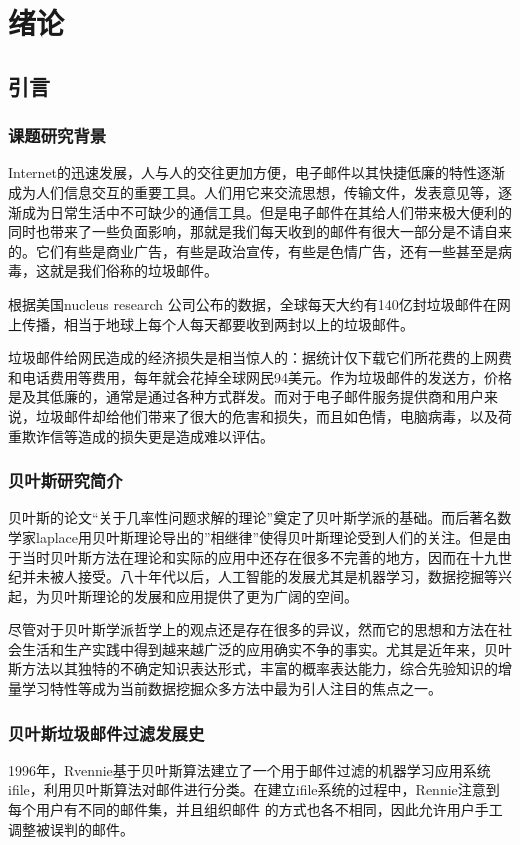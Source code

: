 \chapter{绪论}

\section{引言}

\subsection{课题研究背景}
Internet的迅速发展，人与人的交往更加方便，电子邮件以其快捷低廉的特性逐渐成为人们信息交互的重要工具。人们用它来交流思想，传输文件，发表意见等，逐渐成为日常生活中不可缺少的通信工具。但是电子邮件在其给人们带来极大便利的同时也带来了一些负面影响，那就是我们每天收到的邮件有很大一部分是不请自来的。它们有些是商业广告，有些是政治宣传，有些是色情广告，还有一些甚至是病毒，这就是我们俗称的垃圾邮件。

根据美国nucleus  research 公司公布的数据，全球每天大约有140亿封垃圾邮件在网上传播，相当于地球上每个人每天都要收到两封以上的垃圾邮件。  

垃圾邮件给网民造成的经济损失是相当惊人的：据统计仅下载它们所花费的上网费和电话费用等费用，每年就会花掉全球网民94美元。作为垃圾邮件的发送方，价格是及其低廉的，通常是通过各种方式群发。而对于电子邮件服务提供商和用户来说，垃圾邮件却给他们带来了很大的危害和损失，而且如色情，电脑病毒，以及荷重欺诈信等造成的损失更是造成难以评估。
\subsection{贝叶斯研究简介}
贝叶斯的论文“关于几率性问题求解的理论”奠定了贝叶斯学派的基础。而后著名数学家laplace用贝叶斯理论导出的”相继律”使得贝叶斯理论受到人们的关注。但是由于当时贝叶斯方法在理论和实际的应用中还存在很多不完善的地方，因而在十九世纪并未被人接受。八十年代以后，人工智能的发展尤其是机器学习，数据挖掘等兴起，为贝叶斯理论的发展和应用提供了更为广阔的空间。 

 尽管对于贝叶斯学派哲学上的观点还是存在很多的异议，然而它的思想和方法在社会生活和生产实践中得到越来越广泛的应用确实不争的事实。尤其是近年来，贝叶斯方法以其独特的不确定知识表达形式，丰富的概率表达能力，综合先验知识的增量学习特性等成为当前数据挖掘众多方法中最为引人注目的焦点之一。
\subsection{贝叶斯垃圾邮件过滤发展史}
 1996年，Rvennie基于贝叶斯算法建立了一个用于邮件过滤的机器学习应用系统 ifile\cite{Rennieart}，利用贝叶斯算法对邮件进行分类。在建立ifile系统的过程中，Rennie注意到每个用户有不同的邮件集，并且组织邮件 的方式也各不相同，因此允许用户手工调整被误判的邮件。   
 

